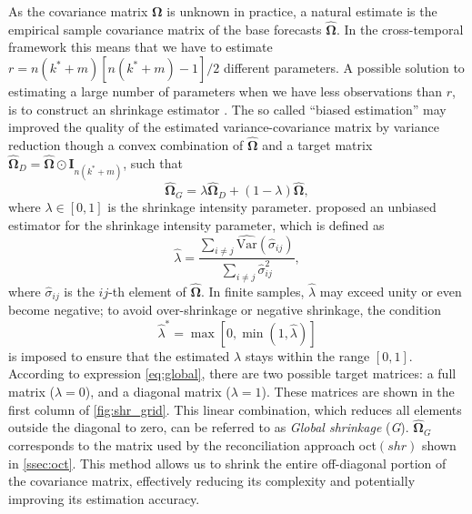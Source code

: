 \documentclass[a4paper,11pt]{article}
\newcommand{\Ivet}{\bm{I}}
\newcommand{\Omegavet}{\bm{\Omega}}
\theoremstyle{definition}
\begin{document}
As the covariance matrix $\Omegavet$ is unknown in practice, a natural estimate is the empirical sample covariance matrix of the base forecasts $\widehat{\Omegavet}$. In the cross-temporal framework this means that we have to estimate $r = n(k^\ast+m)[n(k^\ast+m)-1]/2$ different parameters. A possible solution to estimating a large number of parameters when we have less observations than $r$, is to construct an shrinkage estimator \citep{efron1975a,efron1975,efron1977}. The so called “biased estimation” may improved the quality of the estimated variance-covariance matrix by variance reduction though a convex combination of $\widehat{\Omegavet}$ and a target matrix $\widehat{\Omegavet}_D = \widehat{\Omegavet} \odot \Ivet_{n(k^\ast+m)}$, such that
\begin{equation}\label{eq:global}
	\widehat{\Omegavet}_{G} = \lambda \widehat{\Omegavet}_D + (1-\lambda) \widehat{\Omegavet},
\end{equation}
where $\lambda \in [0,1]$ is the shrinkage intensity parameter.
\cite{schafer2005} proposed an unbiased estimator for the shrinkage intensity parameter, which is defined as
$$
	\widehat{\lambda}=\frac{\sum_{i \neq j} \widehat{\mathrm{Var}}(\widehat{\sigma}_{i j})}{\sum_{i \neq j} \widehat{\sigma}_{i j}^2},
$$
where $\widehat{\sigma}_{i j}$ is the $i j$-th element of $\widehat{\Omegavet}$. In finite samples, $\widehat{\lambda}$ may exceed unity or even become negative; to avoid over-shrinkage or negative shrinkage, the condition
$$
	\widehat{\lambda}^\ast=\max \left[0, \min \left(1, \widehat{\lambda}\right)\right]
$$
is imposed to ensure that the estimated $\lambda$ stays within the range $[0,1]$. According to expression \eqref{eq:global}, there are two possible target matrices: a full matrix ($\lambda=0$), and a diagonal matrix ($\lambda=1$). These matrices are shown in the first column of \autoref{fig:shr_grid}. This linear combination, which reduces all elements outside the diagonal to zero, can be referred to as \textit{Global shrinkage} (\textit{G}). $\widehat{\Omegavet}_{G}$ corresponds to the matrix used by the reconciliation approach oct$(shr)$ shown in \autoref{ssec:oct}. This method allows us to shrink the entire off-diagonal portion of the covariance matrix, effectively reducing its complexity and potentially improving its estimation accuracy.
\end{document}
